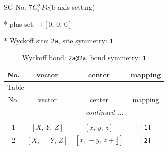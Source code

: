 \documentclass[fleqn,8pt]{jsarticle}
\begin{document}
\setcounter{MaxMatrixCols}{32}

\renewcommand{\tablename}{Table~}
\renewcommand{\figurename}{Figure~}
\begin{center}
\LARGE
SG No. 7\quad$C_{\rm s}^{2}$\quad$Pc$\quad(b-axis setting)\quad[ monoclinic ]
\end{center}

* plus set:\,\,\,$+\left[ 0,\, 0,\, 0 \right]$


* Wyckoff site: {\tt 2a}, site symmetry: {\tt 1}
\renewcommand{\arraystretch}{1.2}
\begin{longtable}{cccc}
\caption{Wyckoff bond: {\tt 2a@2a}, bond symmetry: {\tt 1}}
 \\
 \hline \hline
No. & vector & center & mapping \\ \hline \endfirsthead

\multicolumn{3}{l}{\tablename\ \thetable{}} \\
 \hline \hline
No. & vector & center & mapping \\ \hline \endhead

 \hline \hline
\multicolumn{3}{r}{\footnotesize\it continued ...} \\ \endfoot

 \hline \hline
\multicolumn{3}{r}{} \\ \endlastfoot

1 & $\left[ X,\, Y,\, Z \right]$ & $\left[ x,\, y,\, z \right]$ & {\tt [1]} \\ \hline
2 & $\left[ X,\, - Y,\, Z \right]$ & $\left[ x,\, - y,\, z + \frac{1}{2} \right]$ & {\tt [2]} \\
\end{longtable}
\end{document}
